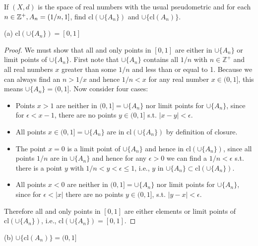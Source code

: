 \newcommand{\cl}{\text{cl}}

\setcounter{question}{11}  %
\begin{question}[Ewing]
If $(X,d)$ is the space of real numbers with the usual pseudometric and for each $n\in\mathbb{Z}^{+}, A_n=(1/n,1]$, find $\cl(\cup\{A_n\})$ and $\cup\{\cl(A_n)\}$.
\end{question}

(a) $\cl(\cup\{A_n\})=[0,1]$

\begin{proof}
We must show that all and only points in $[0,1]$ are either in $\cup\{A_n\}$ or limit points of $\cup\{A_n\}$. First note that $\cup\{A_n\}$ contains all $1/n$ with $n\in\mathbb{Z}^{+}$ and all real numbers $x$ greater than some $1/n$ and less than or equal to 1. Because we can always find an $n>1/x$ and hence $1/n < x$ for any real number $x\in(0,1]$, this means $\cup\{A_n\}=(0,1]$. Now consider four cases:
\begin{itemize}
\item Points $x>1$ are neither in $(0,1]=\cup\{A_n\}$ nor limit points for $\cup\{A_n\}$, since for $\epsilon < x-1$, there are no points $y\in (0,1]$ s.t. $|x-y|<\epsilon$.
\item All points $x\in(0,1]=\cup\{A_n\}$ are in $\text{cl}(\cup\{A_n\})$ by definition of closure.
\item The point $x=0$ is a limit point of $\cup\{A_n\}$ and hence in $\text{cl}(\cup\{A_n\})$, since all points $1/n$ are in $\cup\{A_n\}$ and hence for any $\epsilon>0$ we can find a $1/n<\epsilon$ s.t. there is a point $y$ with $1/n < y < \epsilon \le 1$, i.e., $y$ in $\cup\{A_n\}\subset\text{cl}(\cup\{A_n\})$.
\item All points $x<0$ are neither in $(0,1]=\cup\{A_n\}$ nor limit points for $\cup\{A_n\}$, since for $\epsilon<|x|$ there are no points $y\in (0,1]$, s.t. $|y-x|< \epsilon$.
\end{itemize}

Therefore all and only points in $[0,1]$ are either elements or limit points of $\text{cl}(\cup\{A_n\})$, i.e., $\text{cl}(\cup\{A_n\})=[0,1]$.
\end{proof}

(b) $\cup\{\cl(A_n)\} = (0,1]$

